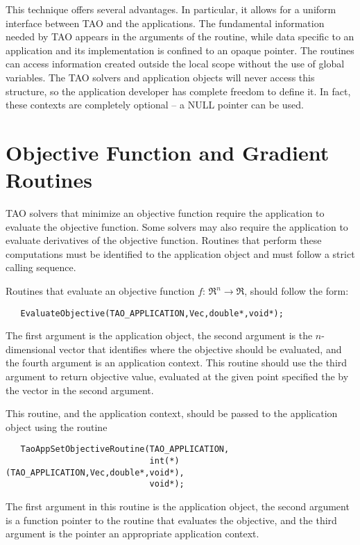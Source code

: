 This technique offers several advantages.
In particular, it allows for a uniform interface between TAO and 
the applications.   The fundamental information needed by TAO 
appears in the arguments of the routine, while data specific to an application
and its implementation is confined to an opaque pointer.
The routines can access information created outside the 
local scope without the use of global variables.
The TAO solvers and application objects will never access this structure, 
so the application developer has complete freedom to define it.  In fact,
these contexts are completely optional -- a NULL pointer can be used.



\section{Objective Function and Gradient Routines}\label{sec:fghj}

TAO solvers that minimize an objective function require
the application to evaluate the objective function.  Some solvers
may also require the application to evaluate
derivatives of the objective function.  
Routines that perform these computations must be identified
to the application object and must follow a strict calling sequence.

Routines that evaluate an objective function $f: \, \Re^n \to \Re$,
should follow the form:
\begin{verbatim}
   EvaluateObjective(TAO_APPLICATION,Vec,double*,void*);
\end{verbatim}
\noindent
The first argument is the application object, the second argument is the
$n$-dimensional vector that identifies where the objective should be evaluated, 
and the fourth argument is an application context.
This routine should use the third argument to return objective value, 
evaluated at the given point
specified the by the vector in the second argument.

This routine, and the application context, should be passed to the 
application object using
the routine 
\begin{verbatim}
   TaoAppSetObjectiveRoutine(TAO_APPLICATION,
                             int(*)(TAO_APPLICATION,Vec,double*,void*),
                             void*);
\end{verbatim}
\noindent
The first argument in this routine is the application object, 
the second argument is a function pointer to the routine that 
evaluates the objective, and the third
argument is the pointer an appropriate application context.  

